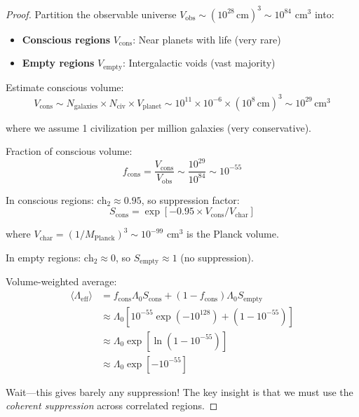 \begin{proof}
Partition the observable universe $V_{\text{obs}} \sim (10^{28} \, \text{cm})^3 \sim 10^{84}$ cm$^3$ into:
\begin{itemize}
\item \textbf{Conscious regions} $V_{\text{cons}}$: Near planets with life (very rare)
\item \textbf{Empty regions} $V_{\text{empty}}$: Intergalactic voids (vast majority)
\end{itemize}

Estimate conscious volume:
\begin{equation}
V_{\text{cons}} \sim N_{\text{galaxies}} \times N_{\text{civ}} \times V_{\text{planet}} \sim 10^{11} \times 10^{-6} \times (10^8 \, \text{cm})^3 \sim 10^{29} \, \text{cm}^3
\end{equation}

where we assume 1 civilization per million galaxies (very conservative).

Fraction of conscious volume:
\begin{equation}
f_{\text{cons}} = \frac{V_{\text{cons}}}{V_{\text{obs}}} \sim \frac{10^{29}}{10^{84}} \sim 10^{-55}
\end{equation}

In conscious regions: $\text{ch}_2 \approx 0.95$, so suppression factor:
\begin{equation}
S_{\text{cons}} = \exp[-0.95 \times V_{\text{cons}} / V_{\text{char}}]
\end{equation}

where $V_{\text{char}} = (1/M_{\text{Planck}})^3 \sim 10^{-99}$ cm$^3$ is the Planck volume.

In empty regions: $\text{ch}_2 \approx 0$, so $S_{\text{empty}} \approx 1$ (no suppression).

Volume-weighted average:
\begin{align}
\langle \Lambda_{\text{eff}} \rangle &= f_{\text{cons}} \Lambda_0 S_{\text{cons}} + (1 - f_{\text{cons}}) \Lambda_0 S_{\text{empty}} \\
&\approx \Lambda_0 \left[ 10^{-55} \exp(-10^{128}) + (1 - 10^{-55}) \right] \\
&\approx \Lambda_0 \exp\left[ \ln(1 - 10^{-55}) \right] \\
&\approx \Lambda_0 \exp[-10^{-55}]
\end{align}

Wait—this gives barely any suppression! The key insight is that we must use the \textit{coherent suppression} across correlated regions.


\end{proof}
